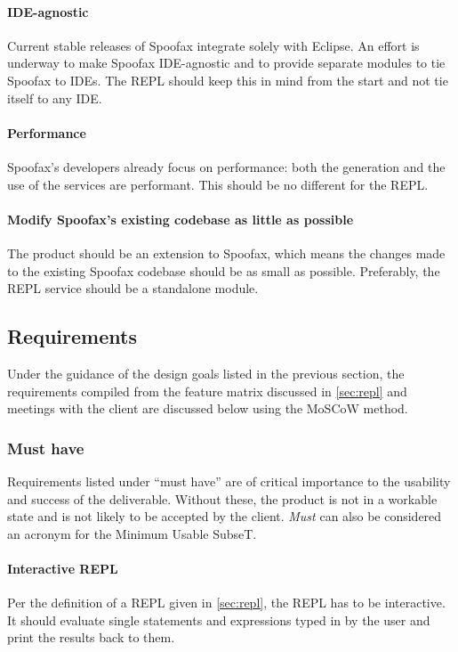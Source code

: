 \paragraph{IDE-agnostic} Current stable releases of Spoofax integrate solely with
Eclipse. An effort is underway to make Spoofax IDE-agnostic and to
provide separate modules to tie Spoofax to IDEs. The REPL should keep this in
mind from the start and not tie itself to any IDE.

\paragraph{Performance} Spoofax's developers already focus on
performance: both the generation and the use of the services are performant.
This should be no different for the REPL.

\paragraph{Modify Spoofax's existing codebase as little as possible} The product
should be an extension to Spoofax, which means the changes made to the existing
Spoofax codebase should be as small as possible. Preferably, the REPL service
should be a standalone module.

\subsection{Requirements}
\label{ssec:requirements}

Under the guidance of the design goals listed in the previous section, the
requirements compiled from the feature matrix discussed in \cref{sec:repl} and
meetings with the client are discussed below using the MoSCoW method.

\subsubsection{Must have}

Requirements listed under ``must have'' are of critical importance to the
usability and success of the deliverable. Without these, the product is not in a
workable state and is not likely to be accepted by the client. \emph{Must} can
also be considered an acronym for the Minimum Usable SubseT.

\paragraph{Interactive REPL} Per the definition of a REPL given in
\cref{sec:repl}, the REPL has to be interactive. It should evaluate single
statements and expressions typed in by the user and print the results back to
them.

